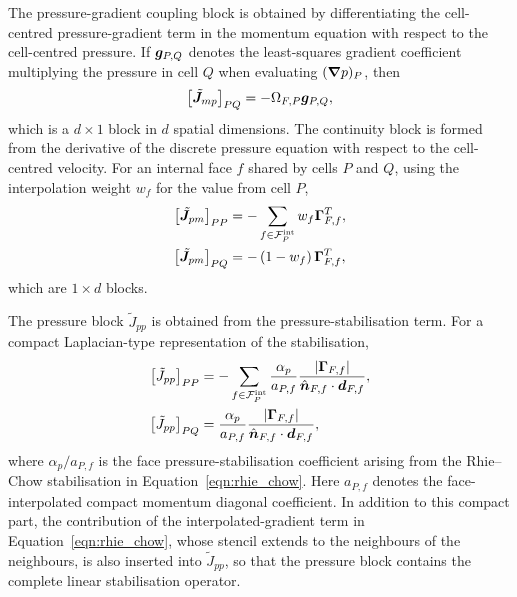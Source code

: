 The pressure-gradient coupling block is obtained by differentiating the cell-centred pressure-gradient term in the momentum equation with respect to the cell-centred pressure.
If $\boldsymbol{g}_{P,Q}$ denotes the least-squares gradient coefficient multiplying the pressure in cell $Q$ when evaluating $(\boldsymbol{\nabla}p)_P$, then
\begin{equation}
    \left[\tilde{\boldsymbol{J}}_{mp}\right]_{P Q}
    =
    -
    \Omega_{F,P}
    \boldsymbol{g}_{P,Q},
    \label{eqn:Jmp}
\end{equation}
which is a $d\times 1$ block in $d$ spatial dimensions.
The continuity block is formed from the derivative of the discrete pressure
equation with respect to the cell-centred velocity. For an internal face $f$
shared by cells $P$ and $Q$, using the interpolation weight $w_f$ for the value
from cell $P$,
\begin{align}
    \left[\tilde{\boldsymbol{J}}_{pm}\right]_{PP}
    &=
    -
    \sum_{f \in \mathcal{F}^{\mathrm{int}}_P}
    w_f \boldsymbol{\Gamma}_{F,f}^{T},
    \label{eqn:Jpm_diag}
    \\
    \left[\tilde{\boldsymbol{J}}_{pm}\right]_{PQ}
    &=
    -
    \left(1-w_f\right)\boldsymbol{\Gamma}_{F,f}^{T},
    \label{eqn:Jpm_offdiag}
\end{align}
which are $1\times d$ blocks.

The pressure block $\tilde{J}_{pp}$ is obtained from the pressure-stabilisation
term. For a compact Laplacian-type representation of the stabilisation,
\begin{align}
    \left[\tilde{J}_{pp}\right]_{PP}
    &=
    -
    \sum_{f \in \mathcal{F}^{\mathrm{int}}_P}
    \frac{\alpha_p}{a_{P,f}}
    \frac{|\boldsymbol{\Gamma}_{F,f}|}
         {\hat{\boldsymbol{n}}_{F,f} \cdot \boldsymbol{d}_{F,f}},
    \label{eqn:Jpp_diag}
    \\
    \left[\tilde{J}_{pp}\right]_{PQ}
    &=
    \frac{\alpha_p}{a_{P,f}}
    \frac{|\boldsymbol{\Gamma}_{F,f}|}
         {\hat{\boldsymbol{n}}_{F,f} \cdot \boldsymbol{d}_{F,f}},
    \label{eqn:Jpp_offdiag}
\end{align}
where $\alpha_p/a_{P,f}$ is the face pressure-stabilisation coefficient arising
from the Rhie--Chow stabilisation in Equation~\eqref{eqn:rhie_chow}. Here
$a_{P,f}$ denotes the face-interpolated compact momentum diagonal coefficient.
In addition to this compact part, the contribution of the interpolated-gradient term in Equation~\eqref{eqn:rhie_chow}, whose stencil extends to the neighbours of the neighbours, is also inserted into $\tilde{J}_{pp}$, so that the pressure block contains the complete linear stabilisation operator.

